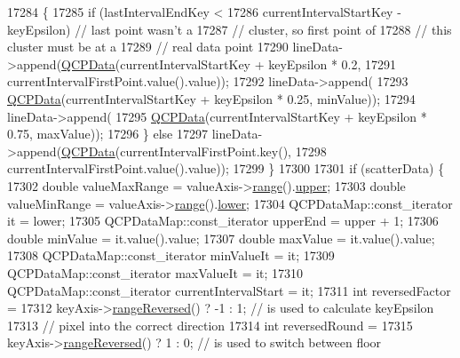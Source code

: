\begin{DoxyCode}
17284       \{
17285         \textcolor{keywordflow}{if} (lastIntervalEndKey <
17286             currentIntervalStartKey - keyEpsilon) \textcolor{comment}{// last point wasn't a}
17287                                                   \textcolor{comment}{// cluster, so first point of}
17288                                                   \textcolor{comment}{// this cluster must be at a}
17289                                                   \textcolor{comment}{// real data point}
17290           lineData->append(\hyperlink{class_q_c_p_data}{QCPData}(currentIntervalStartKey + keyEpsilon * 0.2,
17291                                    currentIntervalFirstPoint.value().value));
17292         lineData->append(
17293             \hyperlink{class_q_c_p_data}{QCPData}(currentIntervalStartKey + keyEpsilon * 0.25, minValue));
17294         lineData->append(
17295             \hyperlink{class_q_c_p_data}{QCPData}(currentIntervalStartKey + keyEpsilon * 0.75, maxValue));
17296       \} \textcolor{keywordflow}{else}
17297         lineData->append(\hyperlink{class_q_c_p_data}{QCPData}(currentIntervalFirstPoint.key(),
17298                                  currentIntervalFirstPoint.value().value));
17299     \}
17300 
17301     \textcolor{keywordflow}{if} (scatterData) \{
17302       \textcolor{keywordtype}{double} valueMaxRange = valueAxis->\hyperlink{class_q_c_p_axis_ab1ea79a4f5ea4cf42620f8f51c477ac4}{range}().\hyperlink{class_q_c_p_range_ae44eb3aafe1d0e2ed34b499b6d2e074f}{upper};
17303       \textcolor{keywordtype}{double} valueMinRange = valueAxis->\hyperlink{class_q_c_p_axis_ab1ea79a4f5ea4cf42620f8f51c477ac4}{range}().\hyperlink{class_q_c_p_range_aa3aca3edb14f7ca0c85d912647b91745}{lower};
17304       QCPDataMap::const\_iterator it = lower;
17305       QCPDataMap::const\_iterator upperEnd = upper + 1;
17306       \textcolor{keywordtype}{double} minValue = it.value().value;
17307       \textcolor{keywordtype}{double} maxValue = it.value().value;
17308       QCPDataMap::const\_iterator minValueIt = it;
17309       QCPDataMap::const\_iterator maxValueIt = it;
17310       QCPDataMap::const\_iterator currentIntervalStart = it;
17311       \textcolor{keywordtype}{int} reversedFactor =
17312           keyAxis->\hyperlink{class_q_c_p_axis_ade26dc7994ccd8a11f64fd83377ee021}{rangeReversed}() ? -1 : 1; \textcolor{comment}{// is used to calculate keyEpsilon}
17313                                              \textcolor{comment}{// pixel into the correct direction}
17314       \textcolor{keywordtype}{int} reversedRound =
17315           keyAxis->\hyperlink{class_q_c_p_axis_ade26dc7994ccd8a11f64fd83377ee021}{rangeReversed}() ? 1 : 0; \textcolor{comment}{// is used to switch between floor}

\end{DoxyCode}
